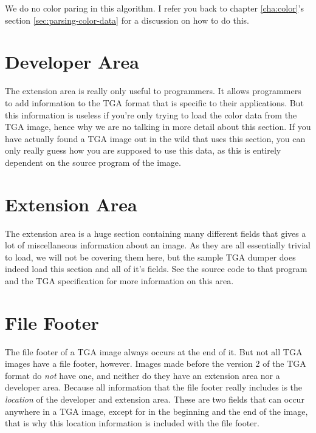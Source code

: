   We do no color paring in this algorithm. I refer you back to chapter
  \ref{cha:color}'s section \ref{sec:parsing-color-data} for a
  discussion on how to do this.

  \section{Developer Area}

  The extension area is really only useful to programmers. It allows
  programmers to add information to the TGA format that is specific
  to their applications. But this information is useless if you're
  only trying to load the color data from the TGA image, hence why we
  are no talking in more detail about this section. If you have
  actually found a TGA image out in the wild that uses this
  section, you can only really guess how you are supposed to use this
  data, as this is entirely dependent on the source program of the image.

  \section{Extension Area}

  The extension area is a huge section containing many different
  fields that gives a lot of miscellaneous information about an
  image. As they are all essentially trivial to load, we will not be
  covering them here, but the sample TGA dumper does indeed load this
  section and all of it's fields. See the source code to that program and
  the TGA specification for more information on this area.

  \section{File Footer}

  The file footer of a TGA image always occurs at the end of it. But
  not all TGA images have a file footer, however. Images made before
  the version 2 of the TGA format do \textit{not} have one, and
  neither do they have an extension area nor a developer area. Because
  all information that the file footer really includes is the
  \textit{location} of the developer and extension area. These are two
  fields that can occur anywhere in a TGA image, except for in the
  beginning and the end of the image, that is why this location
  information is included with the file footer.

